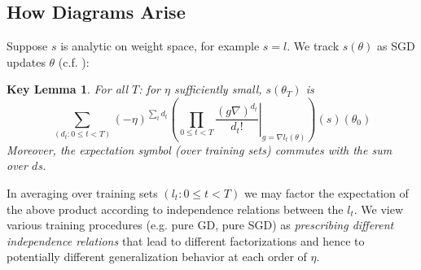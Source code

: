 \documentclass{article}
\newtheorem*{klem*}{Key Lemma}
\begin{document}
    \subsection{How Diagrams Arise}
        Suppose $s$ is analytic on weight space, for example $s=l$.
        We track $s(\theta)$ as SGD updates $\theta$ (c.f. \citet{dy49a}):
        \begin{klem*} %
            For all $T$: for $\eta$ sufficiently small, $s(\theta_T)$ is
            \begin{equation}\label{eq:dyson}
                \sum_{(d_t: 0\leq t<T)}
                (-\eta)^{\sum_t d_t}
                \left(
                    \prod_{0 \leq t < T}
                        \left.
                            \frac{(g \nabla)^{d_t}}{d_t!}
                        \right|_{g=\nabla l_t(\theta)}
                \right)
                (s) (\theta_0)
            \end{equation}
            Moreover, the expectation symbol (over training sets) commutes with
            the sum over $d$s.
        \end{klem*}
        In averaging over training sets $(l_t: 0\leq t<T)$ we may factor the
        expectation of the above product according to independence relations
        between the $l_t$.  We view various training procedures (e.g. pure GD,
        pure SGD) as \emph{prescribing different independence relations} that
        lead to different factorizations and hence to potentially different
        generalization behavior at each order of $\eta$.
    
\end{document}
